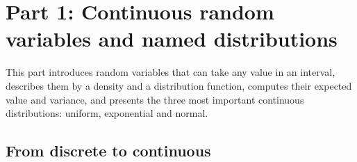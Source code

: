 
\maketitle

\tableofcontents
\clearpage

\section{Part 1: Continuous random variables and named distributions}

This part introduces random variables that can take any value in an
interval, describes them by a density and a distribution function, computes
their expected value and variance, and presents the three most important
continuous distributions: uniform, exponential and normal.

\subsection*{From discrete to continuous}

